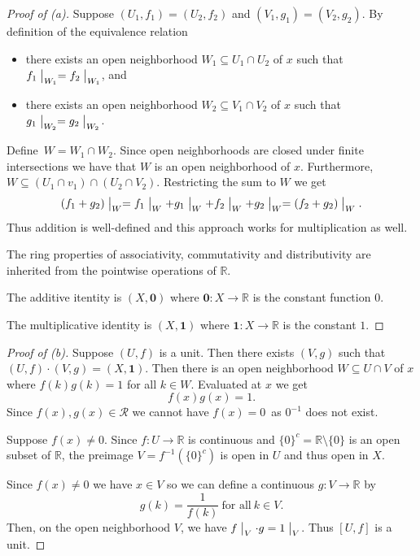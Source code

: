 \documentclass[11pt]{article}
\begin{document}
\begin{proof}[Proof of (a)]
    Suppose $(U_1,f_1) = (U_2, f_2)$ and 
    $(V_1, g_1) = (V_2, g_2)$. By definition of the equivalence 
    relation 
    \begin{itemize}
        \item there exists an open neighborhood 
            $W_1 \subseteq U_1\cap U_2$ of $x$ such that 
            $f_1\bigm|_{W_1} = f_2\bigm|_{W_1}$, and 
        \item there exists an open neighborhood 
            $W_2 \subseteq V_1\cap V_2$ of $x$ such that 
            $g_1\bigm|_{W_2} = g_2\bigm|_{W_2}$.
    \end{itemize}
    Define $W = W_1 \cap W_2$. Since open neighborhoods 
    are closed under finite intersections we have that 
    $W$ is an open neighborhood of $x$. Furthermore, 
    $W \subseteq (U_1 \cap v_1) \cap (U_2 \cap V_2)$. 
    Restricting the sum to $W$ we get 
    \[
        (f_1 + g_2) \bigm|_W 
        = f_1\bigm|_W + g_1\bigm|_W 
        + f_2\bigm|_W + g_2\bigm|_W 
        = 
        (f_2 + g_2) \bigm|_W. 
    \]
    Thus addition is well-defined and this approach works  
    for multiplication as well. 

    The ring properties of associativity, commutativity and 
    distributivity are inherited from the pointwise operations 
    of $\mathbb R$. 

    The additive itentity is $(X,\textbf{0})$ where 
    $\textbf{0} : X \to \mathbb R$ is the constant 
    function $0$. 

    The multiplicative identity is 
    $(X, \textbf{1})$ where $\textbf{1} : X \to \mathbb R$ is 
    the constant $1$. 
\end{proof}
\begin{proof}[Proof of (b)]
    Suppose $(U,f)$ is a unit. Then there exists 
    $(V,g)$ such that $(U,f)\cdot (V,g) = (X,\textbf{1})$. 
    Then there is an open neighborhood $W \subseteq U \cap V$ 
    of $x$ where $f(k)g(k) = 1$ for all $k \in W$. 
    Evaluated at $x$ we get 
    \[
        f(x)g(x) = 1. 
    \]
    Since $f(x),g(x) \in \mathcal R$ we cannot have 
    $f(x) = 0$ as $0^{-1}$ does not exist.  

    Suppose $f(x) \neq 0$. Since $f: U \to \mathbb R$ is 
    continuous and $\{0\}^c = \mathbb R \setminus \{0\}$ is 
    an open subset of $\mathbb R$, the preimage 
    $V = f^{-1}(\{0\}^c)$ is open in $U$ and thus open 
    in $X$. 

    Since $f(x) \neq 0$ we have $x \in V$ so we can define 
    a continuous $g : V \to \mathbb R$ by 
    \[
        g(k) = \frac{1}{f(k)} \ \text{for all} \ k \in V.
    \]
    Then, on the open neighborhood $V$, we have 
    $f\bigm|_V \cdot g = 1\bigm|_V$. Thus 
    $[U,f]$ is a unit. 
\end{proof}
\end{document}
